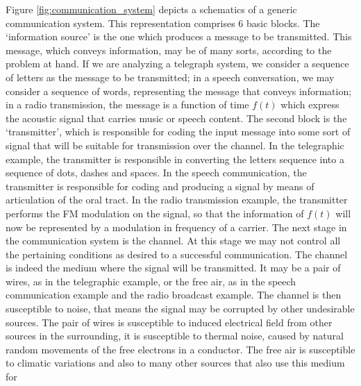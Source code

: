 Figure \ref{fig:communication_system} depicts a schematics of a generic communication system. 
This representation comprises 6 basic blocks. 
The `information source' is the one which produces a message to be transmitted. 
This message, which conveys information, may be of many sorts, according to the problem at hand. 
If we are analyzing a telegraph system, we consider a sequence of letters as the message 
to be transmitted; 
in a speech conversation, we may consider 
a sequence of words, 
representing the message that conveys information; 
in a radio transmission, the message is a function of time $f(t)$
which express the acoustic signal that carries music or speech content. 
The second block is the `transmitter', which is responsible for coding the input message 
into some sort of signal that will be suitable for transmission over the channel. 
In the telegraphic example, the transmitter is responsible in converting the letters sequence 
into a sequence of dots, dashes and spaces. In the speech communication, the transmitter is responsible 
for coding and producing a signal by means of articulation of the oral tract. 
In the radio transmission example, the transmitter performs the FM modulation on the signal, so that the information 
of $f(t)$ will now be represented by a modulation in frequency of a carrier. 
The next stage in the communication system is the channel. 
At this stage we may not control all the pertaining conditions as desired to a successful communication. 
The channel is indeed the medium where the signal will be transmitted. It may be a pair of wires, 
as in the telegraphic example, or the free air, as in the speech communication example and the radio broadcast example. 
The channel is then susceptible to noise, that means the signal may be corrupted by other undesirable sources. 
The pair of wires is susceptible to induced electrical field from other sources in the surrounding, 
it is susceptible to thermal noise, caused by natural random movements of the free electrons in a conductor. 
The free air is susceptible to climatic variations and also to many other sources that also use this medium for 
